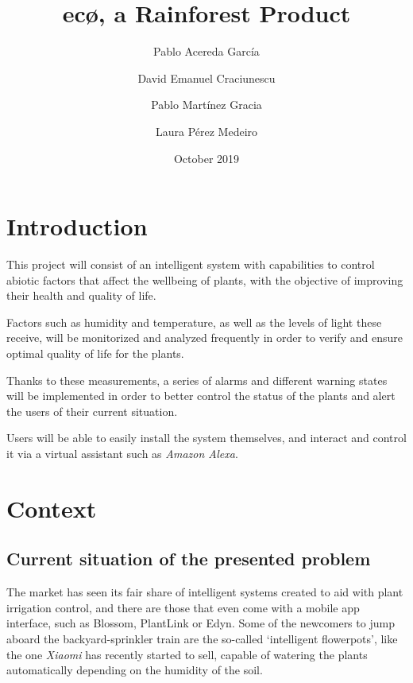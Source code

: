 \documentclass[english,runningheads,a4paper]{llncs}[2018/03/10]
\title{ec\textbf{\o}, a Rainforest Product}
\author{
    Pablo Acereda García \and
    David Emanuel Craciunescu \and
    Pablo Martínez Gracia \and
    Laura Pérez Medeiro
}
\date{October 2019}
\begin{document}
\maketitle


\section*{Introduction}

This project will consist of an intelligent system with capabilities to control
abiotic factors that affect the wellbeing of plants, with the objective of
improving their health and quality of life.

Factors such as humidity and temperature, as well as the levels of light these
receive, will be monitorized and analyzed frequently in order to verify and
ensure optimal quality of life for the plants.

Thanks to these measurements, a series of alarms and different warning states
will be implemented in order to better control the status of the plants and
alert the users of their current situation.

Users will be able to easily install the system themselves, and interact and
control it via a virtual assistant such as \textit{Amazon Alexa}.


\section*{Context}


    \subsection*{Current situation of the presented problem}

    The market has seen its fair share of intelligent systems created to aid
    with plant irrigation control, and there are those that even come with a
    mobile app interface, such as Blossom, PlantLink or Edyn. Some of the
    newcomers to jump aboard the backyard-sprinkler train are the so-called
    `intelligent flowerpots', like the one \textit{Xiaomi} has recently started
    to sell, capable of watering the plants automatically depending on the
    humidity of the soil.
\end{document}
